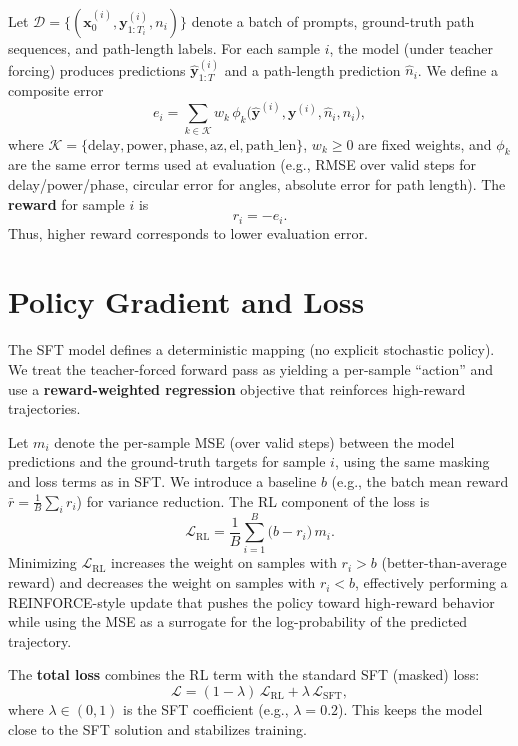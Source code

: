 \documentclass[11pt,a4paper]{article}
\begin{document}
Let $\mathcal{D} = \{ (\bm{x}_0^{(i)}, \bm{y}_{1:T_i}^{(i)}, n_i) \}$ denote a batch of prompts, ground-truth path sequences, and path-length labels. For each sample $i$, the model (under teacher forcing) produces predictions $\hat{\bm{y}}_{1:T}^{(i)}$ and a path-length prediction $\hat{n}_i$. We define a composite error
\begin{equation}
  e_i = \sum_{k \in \mathcal{K}} w_k \, \phi_k\bigl( \hat{\bm{y}}^{(i)}, \bm{y}^{(i)}, \hat{n}_i, n_i \bigr),
\end{equation}
where $\mathcal{K} = \{\text{delay}, \text{power}, \text{phase}, \text{az}, \text{el}, \text{path\_len}\}$, $w_k \geq 0$ are fixed weights, and $\phi_k$ are the same error terms used at evaluation (e.g., RMSE over valid steps for delay/power/phase, circular error for angles, absolute error for path length). The \textbf{reward} for sample $i$ is
\begin{equation}
  r_i = -e_i.
\end{equation}
Thus, higher reward corresponds to lower evaluation error.

\section{Policy Gradient and Loss}

The SFT model defines a deterministic mapping (no explicit stochastic policy). We treat the teacher-forced forward pass as yielding a per-sample “action” and use a \textbf{reward-weighted regression} objective that reinforces high-reward trajectories.

Let $m_i$ denote the per-sample MSE (over valid steps) between the model predictions and the ground-truth targets for sample $i$, using the same masking and loss terms as in SFT. We introduce a baseline $b$ (e.g., the batch mean reward $\bar{r} = \frac{1}{B}\sum_i r_i$) for variance reduction. The RL component of the loss is
\begin{equation}
  \mathcal{L}_{\text{RL}} = \frac{1}{B} \sum_{i=1}^{B} \bigl( b - r_i \bigr) \, m_i.
\end{equation}
Minimizing $\mathcal{L}_{\text{RL}}$ increases the weight on samples with $r_i > b$ (better-than-average reward) and decreases the weight on samples with $r_i < b$, effectively performing a REINFORCE-style update that pushes the policy toward high-reward behavior while using the MSE as a surrogate for the log-probability of the predicted trajectory.

The \textbf{total loss} combines the RL term with the standard SFT (masked) loss:
\begin{equation}
  \mathcal{L} = (1 - \lambda)\,\mathcal{L}_{\text{RL}} + \lambda\,\mathcal{L}_{\text{SFT}},
\end{equation}
where $\lambda \in (0,1)$ is the SFT coefficient (e.g., $\lambda = 0.2$). This keeps the model close to the SFT solution and stabilizes training.
\end{document}
